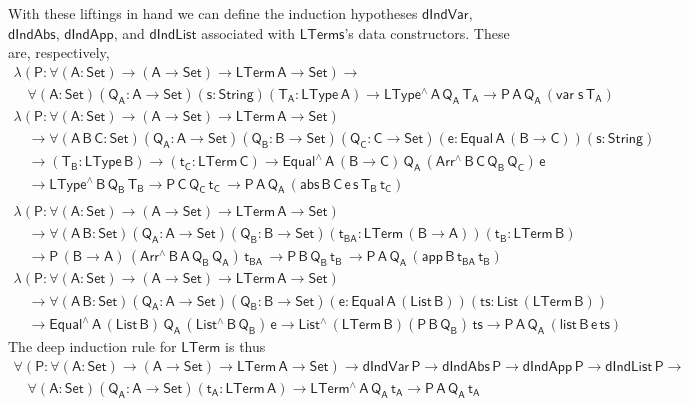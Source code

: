 \documentclass[9pt]{entcs}
\begin{document}
With these liftings in hand we can define the induction hypotheses
$\mathsf{dIndVar}$, $\mathsf{dIndAbs}$, $\mathsf{dIndApp}$, and
$\mathsf{dIndList}$ associated with $\mathsf{LTerms}$'s data
constructors. These are, respectively,
\[\begin{array}{l}
\mathsf{\lambda (P : \forall (A : Set) \to (A \to Set) \to
  LTerm\,A  \to Set) \to}\\
  \quad\mathsf{\forall (A : Set) (Q_A : A \to Set) (s : String) (T_A :
  LType\, A) \to LType^{\wedge} \, A\, Q_A\, T_A \to P \, A\, Q_A\,
  (var \; s\, T_A)}\\[1ex]
  \mathsf{\lambda (P : \forall (A : Set) \to (A \to Set) \to
  LTerm\,A \to Set)} \\ 
  \quad\mathsf{\to 
  \forall (A\,B\,C: Set) (Q_A : A \to Set)  (Q_B : B \to Set) (Q_C : C
  \to Set) (e : Equal\, A\, (B \to C)) (s : String) } \\ 
  \quad\mathsf{ \to (T_B : LType\, B) \to (t_C : LTerm\, C)
  \to Equal^{\wedge}\,A\,(B \to C)\, Q_A \, (Arr^{\wedge} \, B\, C\,
  Q_B \, Q_C) \, e } \\
  \quad\mathsf{
  \to LType^{\wedge}\, B\, Q_B\, T_B
  \to P\, C\, Q_C\, t_C\, 
  \to P \, A\, Q_A\, (abs \,B \,C \, e \,s \,T_B \, t_C)
  }\\[1ex]
\end{array}\]
\[\begin{array}{l}
  \mathsf{\lambda (P : \forall (A : Set) \to (A \to Set) \to LTerm\,A
    \to Set)} \\ 
  \quad \mathsf{\to 
  \forall (A \,B : Set) (Q_A : A \to Set)  (Q_B : B \to Set) 
   (t_{BA} : LTerm\, (B \to A)) (t_B : LTerm\, B)} \\
  \quad \mathsf{
  \to P\, (B \to A)\, (Arr^{\wedge} \, B\, A\, Q_B \, Q_A) \, t_{BA} \, 
  \to P\, B\, Q_B\, t_B\, 
  \to P \, A\, Q_A\, (app \,B \,t_{BA} \, t_B) }\\[1ex]
  \mathsf{\lambda (P : \forall (A : Set) \to (A \to Set) \to LTerm\,A
    \to Set)} \\ 
  \quad \mathsf{\to 
  \forall (A \,B : Set) (Q_A : A \to Set)  (Q_B : B \to Set) 
    (e : Equal\, A\, (List\, B)) (ts : List\, (LTerm\, B))} \\ 
  \quad \mathsf{
    \to Equal^{\wedge}\, A\, (List\,B)\, Q_A\, (List^{\wedge}\, B\, Q_B)\, e 
  \to List^{\wedge}\, (LTerm\,B) (P\, B\, Q_B)\, ts
  \to P \, A\, Q_A\, (list \,B \,e \, ts) }
\end{array}\]
The deep induction rule for $\mathsf{LTerm}$ is thus
\begin{equation}\label{eq:ind-lam}
\begin{array}{l}
\mathsf{\forall (P : \forall (A : Set) \to (A \to Set) \to LTerm\,A
  \to Set) \to dIndVar\,P \to dIndAbs\,P \to dIndApp\,P \to
  dIndList\,P \to} \\ \quad \mathsf{\forall (A : Set)(Q_A : A \to
  Set)(t_A : LTerm\,A) \to LTerm^{\wedge}\,A\,Q_A\,t_A \to
  P\,A\,Q_A\,t_A}
\end{array}
\end{equation}
\end{document}
